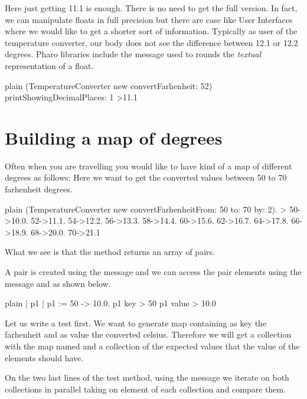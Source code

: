 \documentclass[10pt,twoside,english]{_support/latex/sbabook/sbabook}
\begin{document}
Here just getting 11.1 is enough. There is no need to get the full version. In fact, we can manipulate floats in full precision but there are case like User Interfaces where we would like to get a shorter sort of information.
Typically as user of the temperature converter, our body does not see the difference between 12.1 or 12.2 degrees.
Pharo libraries include the message  used to rounds the \textit{textual} representation of a float.

\begin{displaycode}{plain}
(TemperatureConverter new convertFarhenheit: 52) printShowingDecimalPlaces: 1
>11.1
\end{displaycode}
\section{Building a map of degrees}
Often when you are travelling you would like to have kind of a map of different degrees as follows:
Here we want to get the converted values between 50 to 70 farhenheit degrees.

\begin{displaycode}{plain}
(TemperatureConverter new convertFarhenheitFrom: 50 to: 70 by: 2).
> { 50->10.0.
    52->11.1.
    54->12.2.
    56->13.3.
    58->14.4.
    60->15.6.
    62->16.7.
    64->17.8.
    66->18.9.
    68->20.0.
    70->21.1}
\end{displaycode}

What we see is that the method  returns an array of pairs.

A pair is created using the message \textcode{-\textgreater{}} and we can access the pair elements using the message  and  as shown below.

\begin{displaycode}{plain}
| p1 |
p1 := 50 -> 10.0.
p1 key
> 50
p1 value
> 10.0
\end{displaycode}

Let us write a test first. We want to generate map containing as key the farhenheit and as value the converted celsius. Therefore we will get a collection with the map named  and a collection of the expected values
that the value of the elements should have.

On the two last lines of the test method, using the message  we iterate on both collections in parallel
taking on element of each collection and compare them.
\end{document}
